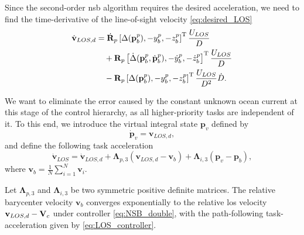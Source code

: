 Since the second-order \gls{nsb} algorithm requires the desired acceleration, we need to find the time-derivative of the line-of-sight velocity \eqref{eq:desired_LOS}
\begin{equation}\label{eq:desired_LOS_derivative}
\begin{split}
        \dot{\mathbf{v}}_{LOS,d} &= \dot{\mathbf{R}}_p\left[ \Delta(\mathbf{p}_b^p), -y_b^p, -z_b^p \right]^{\mathrm{T}} \frac{U_{LOS}}{D} \\ & \quad + \mathbf{R}_p \left[ \dot{\Delta}(\mathbf{p}_b^p, \dot{\mathbf{p}}_b^p), -\dot{y}_b^p, -\dot{z}_b^p \right]^{\mathrm{T}} \frac{U_{LOS}}{D}\\ & \quad - \mathbf{R}_p \left[ \Delta(\mathbf{p}_b^p), -y_b^p, -z_b^p \right]^{\mathrm{T}} \frac{U_{LOS}}{D^2}\dot{D}.
    \end{split}
\end{equation}

We want to eliminate the error caused by the constant unknown ocean current at this stage of the control hierarchy, as all higher-priority tasks are independent of it. To this end, we introduce the virtual integral state $\mathbf{p}_v$ defined by
\begin{equation}\label{eq:los_integral_state}
    \dot{\mathbf{p}}_v = \mathbf{v}_{LOS,d},
\end{equation}
and define the following task acceleration
\begin{equation} \label{eq:LOS_controller}
    \dot{\mathbf{v}}_{LOS} = \dot{\mathbf{v}}_{LOS,d} + \mathbf{\Lambda}_{p,3} (\mathbf{v}_{LOS,d} - \mathbf{v}_b) + \mathbf{\Lambda}_{i,3} (\mathbf{p}_v-\mathbf{p}_b),
\end{equation}
where $\mathbf{v}_b = \tfrac{1}{N} \sum_{i=1}^N \mathbf{v}_i$.

\begin{lemma}\label{lemma:LOS_controller}
    Let $\bm{\Lambda}_{p,3}$ and $\bm{\Lambda}_{i,3}$ be two symmetric positive definite matrices. The relative barycenter velocity $\mathbf{v}_b$ converges exponentially to the relative \gls{los} velocity $\mathbf{v}_{LOS,d}-\mathbf{V}_c$ under controller \eqref{eq:NSB_double}, with the path-following task-acceleration given by \eqref{eq:LOS_controller}.
\end{lemma}

